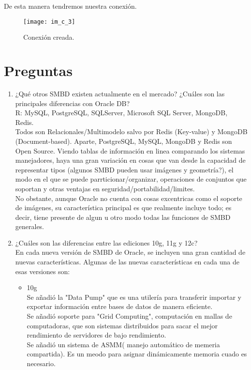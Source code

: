 \documentclass[10pt]{article}
\begin{document}
	De esta manera tendremos nuestra conexión.
	\begin{figure}[H]
		\centering
	\texttt{[image: im\_c\_3]}
	\caption{Conexión creada.}
    \end{figure}
	
	\section{Preguntas}
	\begin{enumerate}
		\item ¿Qué otros SMBD existen actualmente en el mercado? ¿Cuáles son las principales diferencias con Oracle DB?\\
		R: MySQL, PostgreSQL, SQLServer, Microsoft SQL Server, MongoDB, Redis.\\
		Todos son Relacionales/Multimodelo salvo por Redis (Key-value) y MongoDB
		(Document-based).
		Aparte, PostgreSQL, MySQL, MongoDB y Redis son Open Source.
		Viendo tablas de información en linea comparando los sistemas manejadores, haya
		una gran variación en cosas que van desde la capacidad de representar tipos
		(algunos SMBD pueden usar imágenes y geometría?), el modo en el que se puede
		parrticionar/organizar, operaciones de conjuntos que soportan y otras ventajas en
		seguridad/portabilidad/limites.\\ 
		No obstante, aunque Oracle no cuenta con cosas excentricas como el soporte de
		imágenes, su característica principal es que realmente incluye todo; es decir, tiene
		presente de algun u otro modo todas las funciones de SMBD generales.
		
        \item ¿Cuáles son las diferencias entre las ediciones 10g, 11g y 12c?\\
		En cada nueva versión de SMBD de Oracle, se incluyen una gran cantidad
		de nuevas características. Algunas de las nuevas características en 
		cada una de esas versiones son: 
		\begin{itemize}
			\item {
				10g \\
				Se añadió la "Data Pump" que es una utilería para transferir
				importar y exportar información entre bases de datos de manera 
				eficiente. \\
				Se añadió soporte para "Grid Computing", computación en mallas
				de computadoras, que son sistemas distribuidos para sacar el 
				mejor rendimiento de servidores de bajo rendimiento. \\
				Se añadió un sistema de ASMM( manejo automático de memeria 
				compartida). Es un meodo para asignar dinámicamente memoria
				cuado es necesario.

}
\end{itemize}
\end{enumerate}
\end{document}
